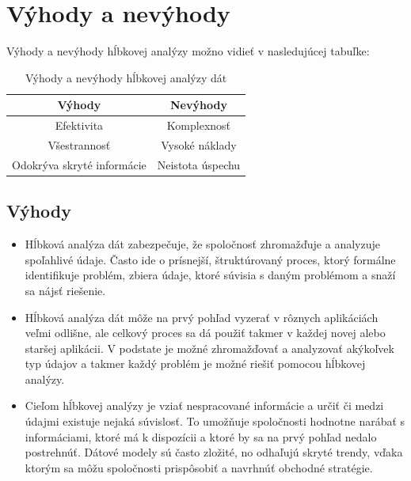 \documentclass[10pt,twoside,slovak,a4paper]{article}
\begin{document}
\section{Výhody a nevýhody}
Výhody a nevýhody hĺbkovej analýzy možno vidieť v nasledujúcej tabuľke:

\begin{table}[h!]
    \centering
    \begin{tabular}{|c||c|}
        \hline
         Výhody &  Nevýhody\\
         \hline\hline
         Efektivita & Komplexnosť\\
         \hline
         Všestrannosť & Vysoké náklady\\
         \hline
         Odokrýva skryté informácie & Neistota úspechu\\
         \hline
    \end{tabular}
    \caption{Výhody a nevýhody hĺbkovej analýzy dát\cite{AlexandraTwin}}
    \label{tab:my_label}
\end{table}
\subsection{Výhody}
\begin{itemize}
\item Hĺbková analýza dát zabezpečuje, že spoločnosť zhromažďuje a analyzuje spoľahlivé údaje. Často ide o prísnejší, štruktúrovaný proces, ktorý formálne identifikuje problém, zbiera údaje, ktoré súvisia s daným problémom a snaží sa nájsť riešenie.\cite{LunaCamp}
\item Hĺbková analýza dát môže na prvý pohľad vyzerať v rôznych aplikáciách veľmi odlišne, ale celkový proces sa dá použiť takmer v každej novej alebo staršej aplikácii. V podstate je možné zhromažďovať a analyzovať akýkoľvek typ údajov a takmer každý problém je možné riešiť pomocou hĺbkovej analýzy.
\item Cieľom hĺbkovej analýzy je vziať nespracované informácie a určiť či medzi údajmi existuje nejaká súvislosť. To umožňuje spoločnosti hodnotne narábať s  informáciami, ktoré má k dispozícii a ktoré by sa na prvý pohľad nedalo postrehnúť. Dátové modely sú často zložité, no odhaľujú skryté trendy, vďaka ktorým sa môžu spoločnosti prispôsobiť a navrhnúť obchodné stratégie.\cite{AlexandraTwin}
\end{itemize}
\end{document}
